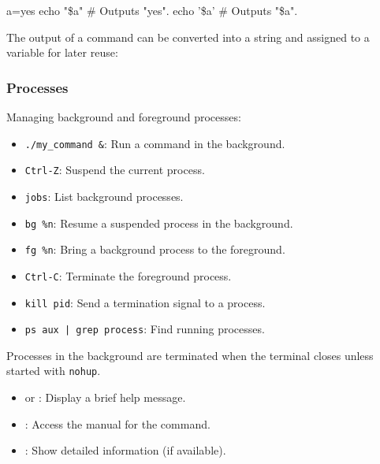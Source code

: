 \begin{exampleblock}[Quoting]
    \begin{codeblock}[language=bash]
a=yes
echo "\$a" # Outputs "yes".
echo '\$a' # Outputs "\$a".
    \end{codeblock}
\end{exampleblock}

The output of a command can be converted into a string and assigned to a variable for later reuse: 


\subsubsection{Processes}

Managing background and foreground processes:
\begin{itemize}
    \item \texttt{./my\_command \&}: Run a command in the background.
    \item \texttt{Ctrl-Z}: Suspend the current process.
    \item \texttt{jobs}: List background processes.
    \item \texttt{bg \%n}: Resume a suspended process in the background.
    \item \texttt{fg \%n}: Bring a background process to the foreground.
    \item \texttt{Ctrl-C}: Terminate the foreground process.
    \item \texttt{kill pid}: Send a termination signal to a process.
    \item \texttt{ps aux | grep process}: Find running processes.
\end{itemize}

Processes in the background are terminated when the terminal closes unless started with \texttt{nohup}.

\begin{tipsblock}
    \begin{itemize}
        \item {} or : Display a brief help message.
        \item {}: Access the manual for the command.
        \item {}: Show detailed information (if available).
    \end{itemize}
\end{tipsblock}